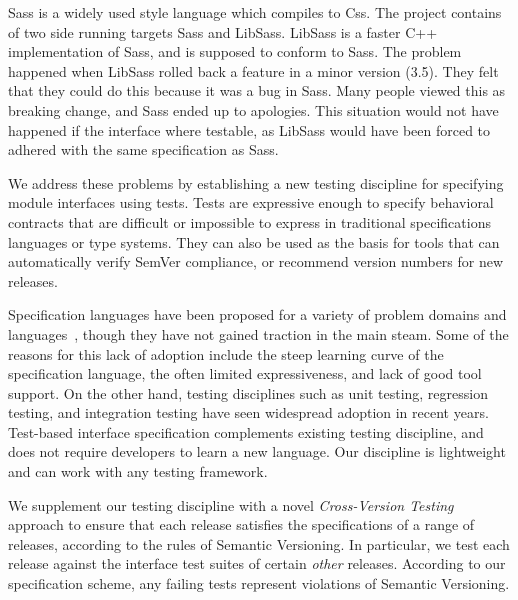 Sass is a widely used style language which compiles to Css. The project
contains of two side running targets Sass and LibSass. LibSass is a 
faster C++ implementation of Sass, and is supposed to conform to Sass. The
problem happened when LibSass rolled back a feature in a minor version (3.5). 
They felt that they could do this because it was a bug in Sass. Many people 
viewed this as breaking change, and Sass ended up to apologies. This situation
would not have happened if the interface where testable, as LibSass would have
been forced to adhered with the same specification as Sass\cite{libsass}. 
%



We address these problems by establishing a new testing discipline for
specifying module interfaces using tests. Tests are expressive enough
to specify behavioral contracts that are difficult or impossible to
express in traditional specifications languages or type systems. They
can also be used as the basis for tools that can automatically verify
SemVer compliance, or recommend version numbers for new releases.

Specification languages have been proposed for a variety of problem
domains and languages~\cite{uml},
though they have not gained traction in the main steam. 
%
Some of the reasons for this lack of adoption include the steep
learning curve of the specification language, the often limited
expressiveness, and lack of good tool support.
%
On the other hand, testing disciplines such as unit testing,
regression testing, and integration testing have seen widespread
adoption in recent years.
%
Test-based interface specification complements existing testing
discipline, and does not require developers to learn a new
language. Our discipline is lightweight and can work with any testing
framework.

We supplement our testing discipline with a novel \emph{Cross-Version
  Testing} approach to ensure that each release satisfies the
specifications of a range of releases, according to the rules of
Semantic Versioning. In particular, we test each release against the
interface test suites of certain {\em other} releases. According to
our specification scheme, any failing tests represent violations of
Semantic Versioning.

